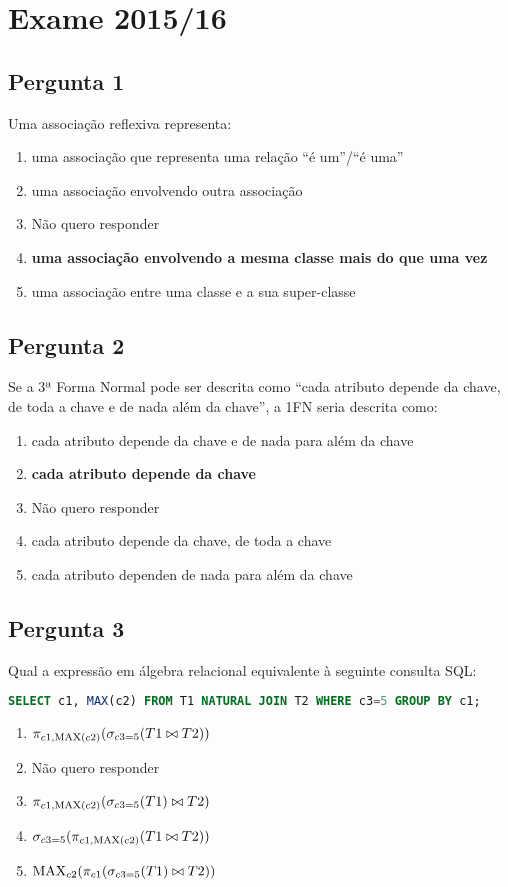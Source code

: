 \setcounter{chapter}{15}
\chapter{Exame 2015/16}
\section{Pergunta 1}
Uma associação reflexiva representa:
\begin{enumerate}[label=\alph*.]\itemsep0em
    \item uma associação que representa uma relação ``é um''/``é uma''
    \item uma associação envolvendo outra associação
    \item Não quero responder
    \item \textbf{uma associação envolvendo a mesma classe mais do que uma vez {\color{green}\checkmark}}
    \item uma associação entre uma classe e a sua super-classe
\end{enumerate}

\section{Pergunta 2}
Se a 3ª Forma Normal pode ser descrita como ``cada atributo depende da chave, de toda a chave e de nada além da chave'', a 1FN seria descrita como:
\begin{enumerate}[label=\alph*.]\itemsep0em
    \item cada atributo depende da chave e de nada para além da chave
    \item \textbf{cada atributo depende da chave {\color{green}\checkmark}}
    \item Não quero responder
    \item cada atributo depende da chave, de toda a chave
    \item cada atributo dependen de nada para além da chave
\end{enumerate}

\section{Pergunta 3}
Qual a expressão em álgebra relacional equivalente à seguinte consulta SQL:
\begin{lstlisting}[language=SQL]
SELECT c1, MAX(c2) FROM T1 NATURAL JOIN T2 WHERE c3=5 GROUP BY c1;
\end{lstlisting}
\begin{enumerate}[label=\alph*.]\itemsep0em
    \item $\pi_{c1, \text{MAX}(c2)}(\sigma_{c3=5}(T1 \bowtie T2))$ {\color{green}\checkmark}
    \item Não quero responder
    \item $\pi_{c1,\text{MAX}(c2)}(\sigma_{c3=5}(T1) \bowtie T2)$
    \item $\sigma_{c3=5}(\pi_{c1,\text{MAX}(c2)}(T1 \bowtie T2))$
    \item $\text{MAX}_{c2}(\pi_{c1}(\sigma_{c3=5}(T1) \bowtie T2))$
\end{enumerate}

